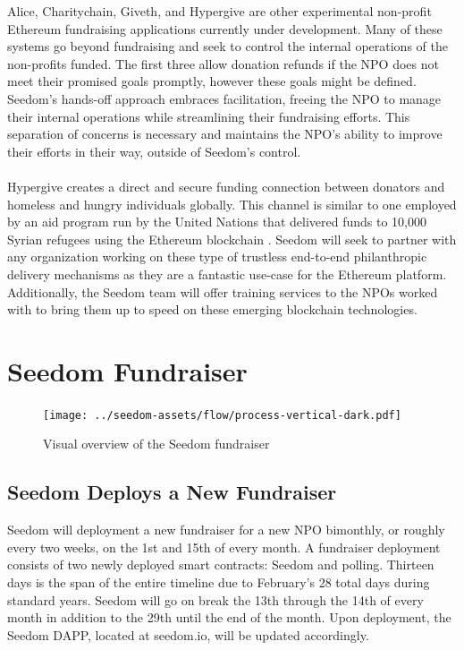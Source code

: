 \documentclass[11pt]{article}
\begin{document}
Alice, Charitychain, Giveth, and Hypergive are other experimental non-profit Ethereum fundraising applications currently under development. Many of these systems go beyond fundraising and seek to control the internal operations of the non-profits funded. The first three allow donation refunds if the NPO does not meet their promised goals promptly, however these goals might be defined. Seedom's hands-off approach embraces facilitation, freeing the NPO to manage their internal operations while streamlining their fundraising efforts. This separation of concerns is necessary and maintains the NPO's ability to improve their efforts in their way, outside of Seedom's control.\\\\
Hypergive creates a direct and secure funding connection between donators and homeless and hungry individuals globally. This channel is similar to one employed by an aid program run by the United Nations that delivered funds to 10,000 Syrian refugees using the Ethereum blockchain \cite{6}. Seedom will seek to partner with any organization working on these type of trustless end-to-end philanthropic delivery mechanisms as they are a fantastic use-case for the Ethereum platform. Additionally, the Seedom team will offer training services to the NPOs worked with to bring them up to speed on these emerging blockchain technologies.

\section{Seedom Fundraiser}

\begin{figure}[H]
\begin{center}
\texttt{[image: ../seedom-assets/flow/process-vertical-dark.pdf]}
\caption{Visual overview of the Seedom fundraiser}
\end{center}
\end{figure}

\subsection{Seedom Deploys a New Fundraiser}

Seedom will deployment a new fundraiser for a new NPO bimonthly, or roughly every two weeks, on the 1st and 15th of every month. A fundraiser deployment consists of two newly deployed smart contracts: Seedom and polling. Thirteen days is the span of the entire timeline due to February's 28 total days during standard years. Seedom will go on break the 13th through the 14th of every month in addition to the 29th until the end of the month. Upon deployment, the Seedom DAPP, located at seedom.io, will be updated accordingly.
\end{document}
